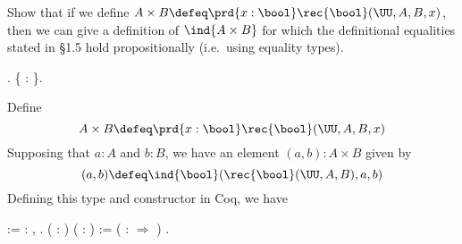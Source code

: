 Show that if we define $A \times B \defeq \prd{x : \bool}
    \rec{\bool}(\UU, A, B, x)$, then we can give a definition of $\ind{A \times
    B}$ for which the definitional equalities stated in \S1.5 hold
    propositionally (i.e.~using equality types). \begin{coqdoccode}
\coqdocemptyline
\coqdocnoindent
{} .\coqdoceol
\coqdocindent{1.00em}
 \{  : \}.\coqdoceol
\coqdocemptyline
\end{coqdoccode}
\soln 
    Define
    \[
    A \times B \defeq \prd{x : \bool} \rec{\bool}(\UU, A, B, x)
    \]
    Supposing that $a : A$ and $b : B$, we have an element $(a, b) : A \times B$
    given by
    \[
    (a, b) \defeq \ind{\bool}(\rec{\bool}(\UU, A, B), a, b)
    \]
    Defining this type and constructor in Coq, we have \begin{coqdoccode}
\coqdocemptyline
\coqdocindent{1.00em}
  := \coqdockw{\ensuremath{\forall}}  : ,      .\coqdoceol
\coqdocemptyline
\coqdocindent{1.00em}
  ( : ) ( : ) :=  (  :  \ensuremath{\Rightarrow}      )  .\coqdoceol
\coqdocemptyline
\end{coqdoccode}


